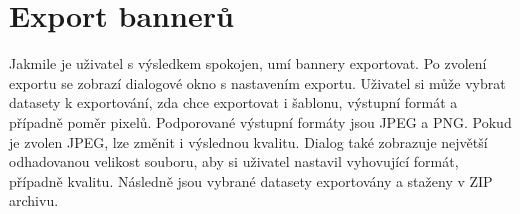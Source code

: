 \section{Export bannerů}
    Jakmile je uživatel s výsledkem spokojen, umí bannery exportovat. Po zvolení exportu se zobrazí dialogové okno s nastavením exportu.
    Uživatel si může vybrat datasety k exportování, zda chce exportovat i šablonu, výstupní formát a případně poměr pixelů.
    Podporované výstupní formáty jsou JPEG a PNG. Pokud je zvolen JPEG, lze změnit i výslednou kvalitu.
    Dialog také zobrazuje největší odhadovanou velikost souboru, aby si uživatel nastavil vyhovující formát, případně kvalitu.
    Následně jsou vybrané datasety exportovány a staženy v ZIP archivu.




\endinput